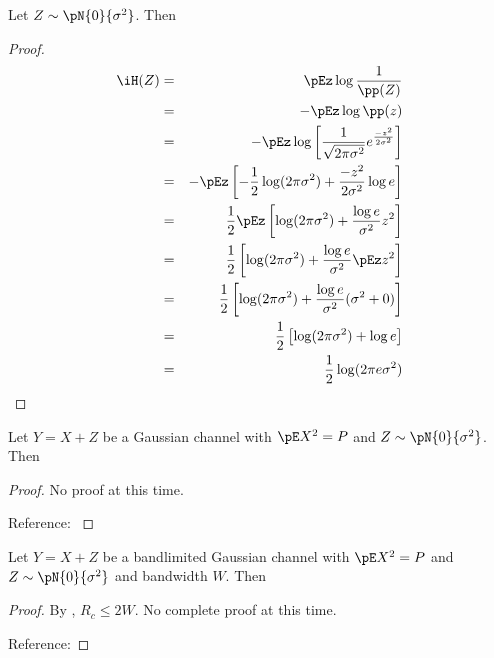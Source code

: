 \begin{theorem}
Let $Z\sim\pN{0}{\sigma^2}$. Then
\end{theorem}
\begin{proof}
\begin{eqnarray*}
  \iH(Z)
    &=& \pEz \log \frac{1}{\pp(Z)}
  \\&=& -\pEz \log \pp(z) 
  \\&=& -\pEz
         \log \left[\frac{1}{\sqrt{2\pi\sigma^2}}e^{\frac{-z^2}{2\sigma^2}} \right] 
  \\&=& -\pEz \left[
        -\frac{1}{2}\log(2\pi\sigma^2) 
        + \frac{-z^2}{2\sigma^2} \log e 
        \right] 
  \\&=& \frac{1}{2} \pEz \left[
        \log(2\pi\sigma^2) 
        + \frac{\log e}{\sigma^2}z^2  
        \right] 
  \\&=& \frac{1}{2} \left[
        \log(2\pi\sigma^2) + \frac{\log e}{\sigma^2}\pEz z^2  
        \right] 
  \\&=& \frac{1}{2} \left[
        \log(2\pi\sigma^2) + \frac{\log e}{\sigma^2}(\sigma^2+0)
        \right] 
  \\&=& \frac{1}{2} \left[
        \log(2\pi\sigma^2) + \log e
        \right] 
  \\&=& \frac{1}{2} \log(2\pi e\sigma^2) 
\end{eqnarray*}
\end{proof}

\begin{theorem}
Let $Y=X+Z$ be a Gaussian channel with $\pE X^2=P$ and
$Z\sim\pN{0}{\sigma^2}$. Then
\end{theorem}
\begin{proof}
No proof at this time. \attention

Reference: \cite[page 241]{cover}
\end{proof}

\begin{theorem}
Let $Y=X+Z$ be a bandlimited Gaussian channel with $\pE X^2=P$ and
$Z\sim\pN{0}{\sigma^2}$ and bandwidth $W$. Then
\end{theorem}
\begin{proof}
By , $R_c \le 2W$.
No complete proof at this time. \attention

Reference: {}
\end{proof}




